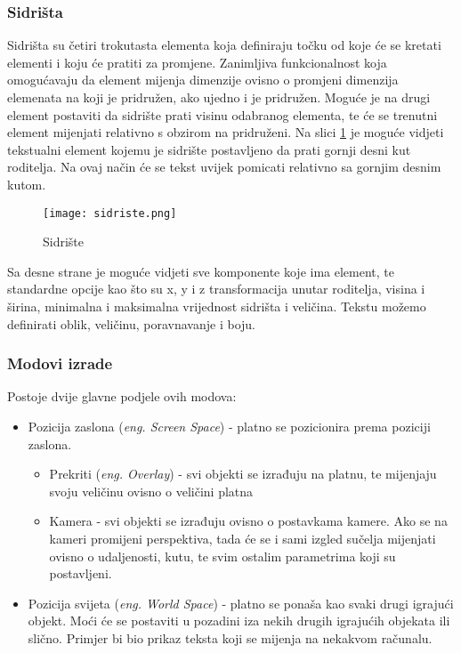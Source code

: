 \subsubsection{Sidrišta}
Sidrišta su četiri trokutasta elementa koja definiraju točku od koje će se kretati elementi i koju će pratiti za promjene. Zanimljiva funkcionalnost koja omogućavaju da element mijenja dimenzije ovisno o promjeni dimenzija elemenata na koji je pridružen, ako ujedno i je pridružen. Moguće je na drugi element postaviti da sidrište prati visinu odabranog elementa, te će se trenutni element mijenjati relativno s obzirom na pridruženi. Na slici \ref{fig:sidriste} je moguće vidjeti tekstualni element kojemu je sidrište postavljeno da prati gornji desni kut roditelja. Na ovaj način će se tekst uvijek pomicati relativno sa gornjim desnim kutom.
\begin{figure}[h]
	\texttt{[image: sidriste.png]}
	\centering
	\caption{Sidrište}
	\label{fig:sidriste}
\end{figure}
\newline
Sa desne strane je moguće vidjeti sve komponente koje ima element, te standardne opcije kao što su x, y i z transformacija unutar roditelja, visina i širina, minimalna i maksimalna vrijednost sidrišta i veličina. Tekstu možemo definirati oblik, veličinu, poravnavanje i boju.
\newpage

\subsubsection{Modovi izrade}
Postoje dvije glavne podjele ovih modova:
\begin{itemize} 
	\item Pozicija zaslona (\emph{eng. Screen Space}) - platno se pozicionira prema poziciji zaslona. 
		\begin{itemize}
			\item Prekriti (\emph{eng. Overlay}) - svi objekti se izrađuju na platnu, te mijenjaju svoju veličinu ovisno o veličini platna
			\item Kamera - svi objekti se izrađuju ovisno o postavkama kamere. Ako se na kameri promijeni perspektiva, tada će se i sami izgled sučelja mijenjati ovisno o udaljenosti, kutu, te svim ostalim parametrima koji su postavljeni.
		\end{itemize}
	\item Pozicija svijeta (\emph{eng. World Space}) - platno se ponaša kao svaki drugi igrajući objekt. Moći će se postaviti u pozadini iza nekih drugih igrajućih objekata ili slično. Primjer bi bio prikaz teksta koji se mijenja na nekakvom računalu.
\end{itemize}

